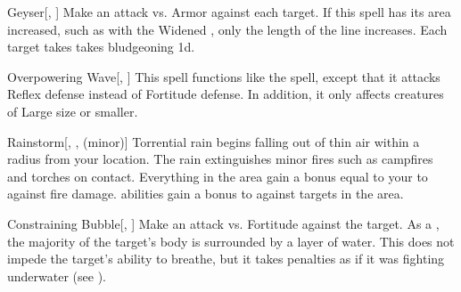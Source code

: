 \lowercase{\hypertarget{spell:Geyser}{}}\label{spell:Geyser}
\begin{freeability}[\nth{2}]{\hypertarget{spell:Geyser}{Geyser}}[, ]
Make an attack vs. Armor against each target.
If this spell has its area increased, such as with the Widened , only the length of the line increases.
\hit Each target takes takes bludgeoning  \plus1d.
\end{freeability}
\vspace{0.25em}



\lowercase{\hypertarget{spell:Overpowering Wave}{}}\label{spell:Overpowering Wave}
\begin{freeability}[\nth{2}]{\hypertarget{spell:Overpowering Wave}{Overpowering Wave}}[, ]
This spell functions like the  spell, except that it attacks Reflex defense instead of Fortitude defense.
In addition, it only affects creatures of Large size or smaller.
\end{freeability}
\vspace{0.25em}



\lowercase{\hypertarget{spell:Rainstorm}{}}\label{spell:Rainstorm}
\begin{freeability}[\nth{2}]{\hypertarget{spell:Rainstorm}{Rainstorm}}[, ,  (minor)]
Torrential rain begins falling out of thin air within a \arealarge radius  from your location.
The rain extinguishes minor fires such as campfires and torches on contact.
Everything in the area gain a bonus equal to your  to  against fire damage.
 abilities gain a  bonus to  against targets in the area.
\end{freeability}
\vspace{0.25em}



\lowercase{\hypertarget{spell:Constraining Bubble}{}}\label{spell:Constraining Bubble}
\begin{freeability}[\nth{3}]{\hypertarget{spell:Constraining Bubble}{Constraining Bubble}}[, ]
Make an attack vs. Fortitude against the target.
\hit As a , the majority of the target's body is surrounded by a layer of water.
This does not impede the target's ability to breathe, but it takes penalties as if it was fighting underwater (see ).
\end{freeability}
\vspace{0.25em}



